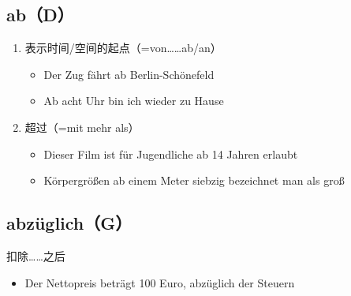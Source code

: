 \documentclass[UTF8]{report}
\begin{document}
\subsection{ab（D）}
\begin{enumerate}
    \item 表示时间/空间的起点（=von……ab/an）
    \begin{itemize}
        \item Der Zug fährt ab Berlin-Schönefeld
        \item Ab acht Uhr bin ich wieder zu Hause
    \end{itemize}
    \item 超过（=mit mehr als）
    \begin{itemize}
        \item Dieser Film ist für Jugendliche ab 14 Jahren erlaubt
        \item Körpergrößen ab einem Meter siebzig bezeichnet man als groß
    \end{itemize}
\end{enumerate}


\subsection{abzüglich（G）}
扣除……之后
\begin{itemize}
    \item Der Nettopreis beträgt 100 Euro, abzüglich der Steuern
\end{itemize}
\end{document}
